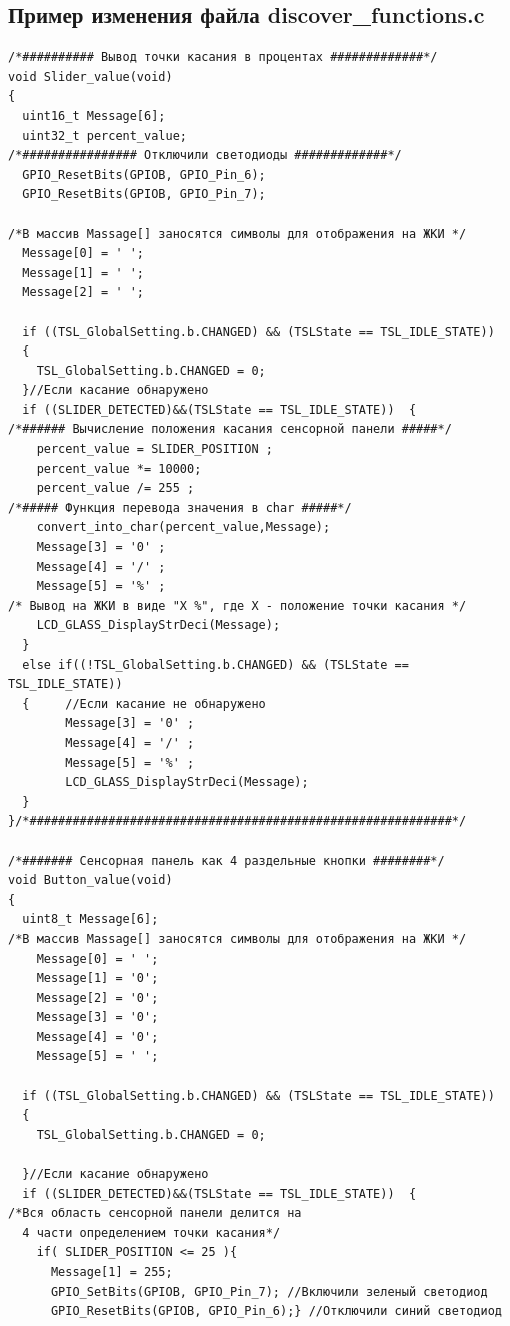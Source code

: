 \subsection{Пример изменения файла discover\_functions.c}
\begin{verbatim}
/*########## Вывод точки касания в процентах #############*/  
void Slider_value(void)
{
  uint16_t Message[6];  
  uint32_t percent_value;
/*################ Отключили светодиоды #############*/  
  GPIO_ResetBits(GPIOB, GPIO_Pin_6);
  GPIO_ResetBits(GPIOB, GPIO_Pin_7);
 
/*В массив Massage[] заносятся символы для отображения на ЖКИ */ 
  Message[0] = ' ';
  Message[1] = ' ';
  Message[2] = ' ';

  if ((TSL_GlobalSetting.b.CHANGED) && (TSLState == TSL_IDLE_STATE)) 
  {
    TSL_GlobalSetting.b.CHANGED = 0;
  }//Если касание обнаружено
  if ((SLIDER_DETECTED)&&(TSLState == TSL_IDLE_STATE))  {
/*###### Вычисление положения касания сенсорной панели #####*/ 
    percent_value = SLIDER_POSITION ;
    percent_value *= 10000;
    percent_value /= 255 ;
/*##### Функция перевода значения в char #####*/      
    convert_into_char(percent_value,Message);
    Message[3] = '0' ;
    Message[4] = '/' ;
    Message[5] = '%' ;   
/* Вывод на ЖКИ в виде "X %", где Х - положение точки касания */
    LCD_GLASS_DisplayStrDeci(Message);
  } 
  else if((!TSL_GlobalSetting.b.CHANGED) && (TSLState == TSL_IDLE_STATE))
  {     //Если касание не обнаружено
        Message[3] = '0' ;
        Message[4] = '/' ;
        Message[5] = '%' ;   
        LCD_GLASS_DisplayStrDeci(Message);
  } 
}/*###########################################################*/  

/*####### Сенсорная панель как 4 раздельные кнопки ########*/  
void Button_value(void)
{
  uint8_t Message[6];  
/*В массив Massage[] заносятся символы для отображения на ЖКИ */   
    Message[0] = ' ';
    Message[1] = '0';
    Message[2] = '0';
    Message[3] = '0';
    Message[4] = '0';
    Message[5] = ' ';
    
  if ((TSL_GlobalSetting.b.CHANGED) && (TSLState == TSL_IDLE_STATE)) 
  {
    TSL_GlobalSetting.b.CHANGED = 0;

  }//Если касание обнаружено
  if ((SLIDER_DETECTED)&&(TSLState == TSL_IDLE_STATE))  {
/*Вся область сенсорной панели делится на 
  4 части определением точки касания*/  
    if( SLIDER_POSITION <= 25 ){
      Message[1] = 255;       
      GPIO_SetBits(GPIOB, GPIO_Pin_7); //Включили зеленый светодиод
      GPIO_ResetBits(GPIOB, GPIO_Pin_6);} //Отключили синий светодиод


\end{verbatim}

